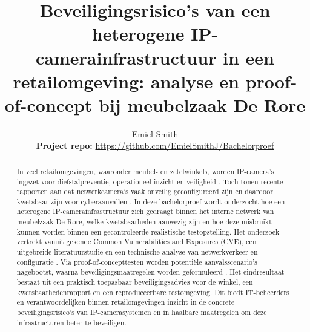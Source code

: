 \documentclass{hogent-article}
\title{Beveiligingsrisico’s van een heterogene IP-camerainfrastructuur in een retailomgeving: analyse en proof-of-concept bij meubelzaak De Rore}
\author{Emiel Smith\\
    {\small\textbf{Project repo:} \url{https://github.com/EmielSmithJ/Bachelorproef}}}
\begin{document}
\begin{abstract}
In veel retailomgevingen, waaronder meubel- en zetelwinkels, worden IP-camera’s ingezet voor diefstalpreventie, 
operationeel inzicht en veiligheid \parencite{ENISA2024}. Toch tonen recente rapporten aan dat netwerkcamera’s vaak onveilig geconfigureerd zijn en daardoor kwetsbaar zijn voor cyberaanvallen \parencite{Butun2019}. 
In deze bachelorproef wordt onderzocht hoe een heterogene IP-camerainfrastructuur zich gedraagt binnen het interne netwerk van meubelzaak De Rore, 
welke kwetsbaarheden aanwezig zijn en hoe deze misbruikt kunnen worden binnen een gecontroleerde realistische testopstelling. 
Het onderzoek vertrekt vanuit gekende Common Vulnerabilities and Exposures (CVE), een uitgebreide literatuurstudie en een technische analyse van netwerkverkeer en configuratie \parencite{CVEdb}. 
Via proof-of-concepttesten worden potentiële aanvalsscenario’s nagebootst, waarna beveiligingsmaatregelen worden geformuleerd \parencite{MicrosoftSTRIDE2022}. 
Het eindresultaat bestaat uit een praktisch toepasbaar beveiligingsadvies voor de winkel, 
een kwetsbaarhedenrapport en een reproduceerbare testomgeving. Dit biedt IT-beheerders en verantwoordelijken binnen retailomgevingen inzicht in de concrete beveiligingsrisico’s van IP-camerasystemen en in haalbare maatregelen om deze infrastructuren beter te beveiligen.
\end{abstract}

\tableofcontents



\nocite{*}
\printbibliography[heading=bibintoc]
\end{document}
